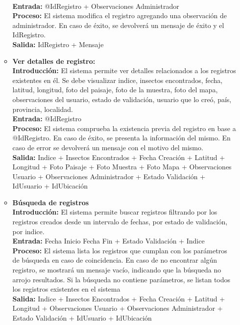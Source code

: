 \begin{enumerate}[A.]
\begin{itemize}
            \\ \textbf{Entrada:} @IdRegistro + Observaciones Administrador
            \\ \textbf{Proceso:} El sistema modifica el registro agregando una observación de administrador. En caso de éxito, se devolverá un mensaje de éxito y el IdRegistro.
            \\ \textbf{Salida:} IdRegistro + Mensaje
            \\
          \item \textbf{Ver detalles de registro:}
            \\ \textbf{Introducción:} El sistema permite ver detalles relacionados a los registros existentes en él. Se debe visualizar indice, insectos encontrados, fecha, latitud, longitud, foto del paisaje, foto de la muestra, foto del mapa, observaciones del usuario, estado de validación, usuario que lo creó, país, provincia, localidad.
            \\ \textbf{Entrada:} @IdRegistro
            \\ \textbf{Proceso:} El sistema comprueba la existencia previa del registro en base a @IdRegistro. En caso de éxito, se presenta la información del mismo. En caso de error se devolverá un mensaje con el motivo del mismo.
            \\ \textbf{Salida:} Indice + Insectos Encontrados + Fecha Creación + Latitud + Longitud + Foto Paisaje + Foto Muestra + Foto Mapa + Observaciones Usuario + Observaciones Administrador + Estado Validación + IdUsuario + IdUbicación
            \\
          \item \textbf{Búsqueda de registros}
            \\ \textbf{Introducción:} El sistema permite buscar registros filtrando por los registros creados desde un intervalo de fechas, por estado de validación, por indice.
            \\ \textbf{Entrada:} Fecha Inicio Fecha Fin + Estado Validación + Indice
            \\ \textbf{Proceso:} El sistema lista los registros que cumplan con los parámetros de búsqueda en caso de coincidencia. En caso de no encontrar algún registro, se mostrará un mensaje vacío, indicando que la búsqueda no arrojo resultados. Si la búsqueda no contiene parámetros, se listan todos los registros existentes en el sistema
            \\ \textbf{Salida:} Indice + Insectos Encontrados + Fecha Creación + Latitud + Longitud + Observaciones Usuario + Observaciones Administrador + Estado Validación + IdUsuario + IdUbicación
        \end{itemize}


\end{enumerate}
